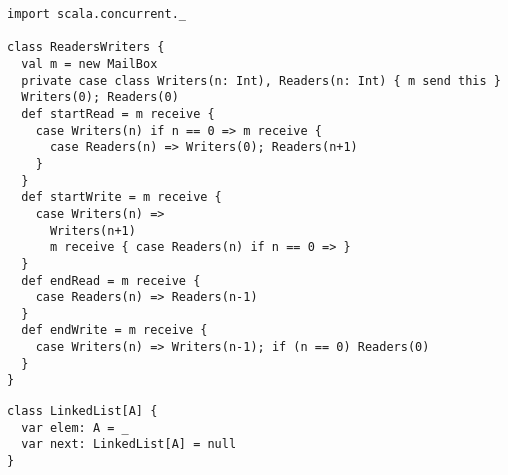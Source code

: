 \begin{itemize}


\begin{lstlisting}
import scala.concurrent._

class ReadersWriters {
  val m = new MailBox
  private case class Writers(n: Int), Readers(n: Int) { m send this }
  Writers(0); Readers(0)
  def startRead = m receive {
    case Writers(n) if n == 0 => m receive {
      case Readers(n) => Writers(0); Readers(n+1)
    }
  }
  def startWrite = m receive {
    case Writers(n) =>
      Writers(n+1)
      m receive { case Readers(n) if n == 0 => }
  }
  def endRead = m receive {
    case Readers(n) => Readers(n-1)
  }
  def endWrite = m receive {
    case Writers(n) => Writers(n-1); if (n == 0) Readers(0)
  }
}
\end{lstlisting}


\begin{lstlisting}
class LinkedList[A] {
  var elem: A = _
  var next: LinkedList[A] = null
}
\end{lstlisting}


\end{itemize}
